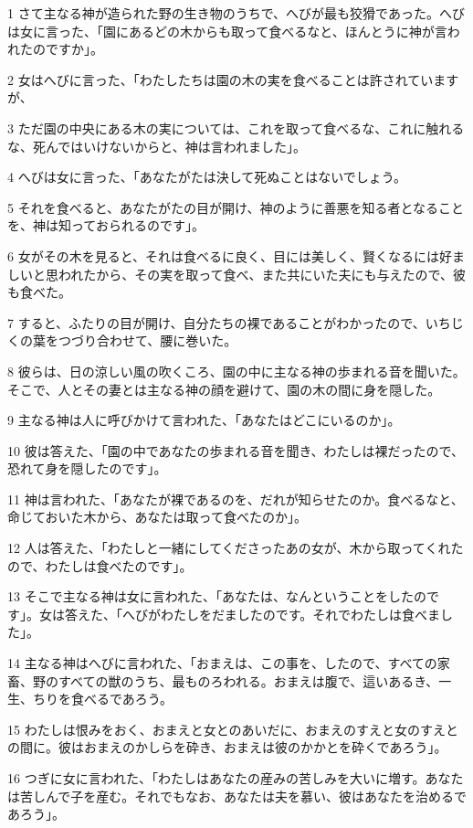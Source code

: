 \par 1 さて主なる神が造られた野の生き物のうちで、へびが最も狡猾であった。へびは女に言った、「園にあるどの木からも取って食べるなと、ほんとうに神が言われたのですか」。
\par 2 女はへびに言った、「わたしたちは園の木の実を食べることは許されていますが、
\par 3 ただ園の中央にある木の実については、これを取って食べるな、これに触れるな、死んではいけないからと、神は言われました」。
\par 4 へびは女に言った、「あなたがたは決して死ぬことはないでしょう。
\par 5 それを食べると、あなたがたの目が開け、神のように善悪を知る者となることを、神は知っておられるのです」。
\par 6 女がその木を見ると、それは食べるに良く、目には美しく、賢くなるには好ましいと思われたから、その実を取って食べ、また共にいた夫にも与えたので、彼も食べた。
\par 7 すると、ふたりの目が開け、自分たちの裸であることがわかったので、いちじくの葉をつづり合わせて、腰に巻いた。
\par 8 彼らは、日の涼しい風の吹くころ、園の中に主なる神の歩まれる音を聞いた。そこで、人とその妻とは主なる神の顔を避けて、園の木の間に身を隠した。
\par 9 主なる神は人に呼びかけて言われた、「あなたはどこにいるのか」。
\par 10 彼は答えた、「園の中であなたの歩まれる音を聞き、わたしは裸だったので、恐れて身を隠したのです」。
\par 11 神は言われた、「あなたが裸であるのを、だれが知らせたのか。食べるなと、命じておいた木から、あなたは取って食べたのか」。
\par 12 人は答えた、「わたしと一緒にしてくださったあの女が、木から取ってくれたので、わたしは食べたのです」。
\par 13 そこで主なる神は女に言われた、「あなたは、なんということをしたのです」。女は答えた、「へびがわたしをだましたのです。それでわたしは食べました」。
\par 14 主なる神はへびに言われた、「おまえは、この事を、したので、すべての家畜、野のすべての獣のうち、最ものろわれる。おまえは腹で、這いあるき、一生、ちりを食べるであろう。
\par 15 わたしは恨みをおく、おまえと女とのあいだに、おまえのすえと女のすえとの間に。彼はおまえのかしらを砕き、おまえは彼のかかとを砕くであろう」。
\par 16 つぎに女に言われた、「わたしはあなたの産みの苦しみを大いに増す。あなたは苦しんで子を産む。それでもなお、あなたは夫を慕い、彼はあなたを治めるであろう」。
